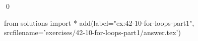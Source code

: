 
\begin{ex}
  \label{ex:42-10-for-loops-part1}
  
  \qed
\end{ex}
\begin{python0}
from solutions import *
add(label="ex:42-10-for-loops-part1",
    srcfilename='exercises/42-10-for-loops-part1/answer.tex')
\end{python0}
